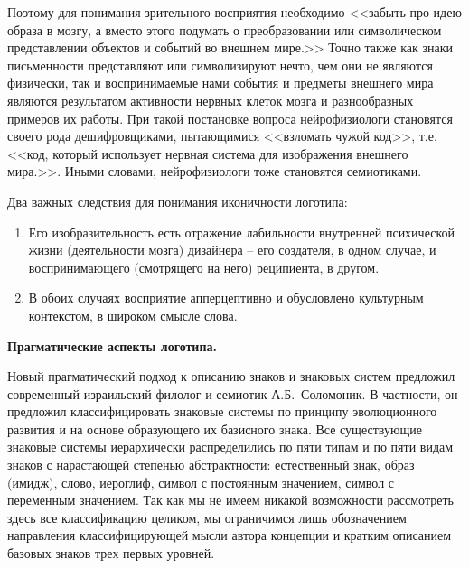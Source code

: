 Поэтому для понимания зрительного восприятия необходимо <<забыть про идею образа
в мозгу, а вместо этого подумать о преобразовании или символическом
представлении объектов и событий во внешнем мире.>> \autocite[][33-34]{velyanur2006}
Точно также как знаки письменности представляют или символизируют нечто,
чем они не являются физически, так и воспринимаемые нами события и предметы
внешнего мира являются результатом активности нервных клеток мозга и
разнообразных примеров их работы. При такой постановке вопроса нейрофизиологи
становятся своего рода дешифровщиками, пытающимися <<взломать чужой код>>,
т.е. <<код, который использует нервная система для изображения внешнего мира.>>\autocite[][34]{velyanur2006}.
Иными словами, нейрофизиологи тоже становятся семиотиками.

Два важных следствия для понимания иконичности логотипа:
\begin{enumerate}
\item Его изобразительность есть отражение лабильности внутренней
  психической жизни (деятельности мозга) дизайнера -- его создателя, в одном
  случае, и воспринимающего (смотрящего на него) реципиента, в другом.
\item В обоих случаях восприятие апперцептивно и обусловлено культурным
  контекстом, в широком смысле слова.
\end{enumerate}

\textbf{Прагматические аспекты логотипа.}

Новый прагматический подход к описанию знаков и знаковых систем предложил
современный израильский филолог и семиотик А.Б.~Соломоник.
\autocite{solomonik1995}\autocite{solomonik2004}\autocite{solomonik2009}
В частности, он предложил классифицировать знаковые системы по принципу
эволюционного развития и на основе образующего их базисного знака.
Все существующие знаковые системы иерархически распределились по пяти типам и
по пяти видам знаков с нарастающей степенью абстрактности: естественный знак,
образ (имидж), слово, иероглиф, символ с постоянным значением, символ с
переменным значением\autocite[][76-86]{solomonik2009}. Так как мы не имеем
никакой возможности рассмотреть здесь все классификацию целиком, мы
ограничимся лишь обозначением направления классифицирующей мысли автора
концепции и кратким описанием  базовых знаков трех первых уровней.

